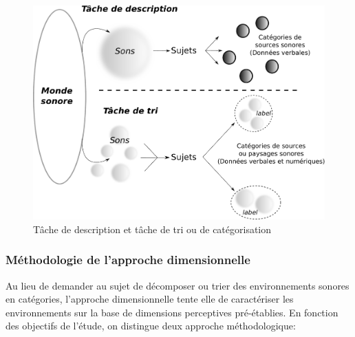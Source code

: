 \begin{figure}[bth]
        \myfloatalign
        \includegraphics[width=\linewidth]{gfx/desCat}
        \caption{Tâche de description et tâche de tri ou de catégorisation}\label{fig:descat}
\end{figure}


\subsubsection{Méthodologie de l'approche dimensionnelle}

Au lieu de demander au sujet de décomposer ou trier des environnements sonores en catégories, l'approche dimensionnelle tente elle de caractériser les environnements sur la base de dimensions perceptives pré-établies. En fonction des objectifs de l'étude, on distingue deux approche méthodologique:

